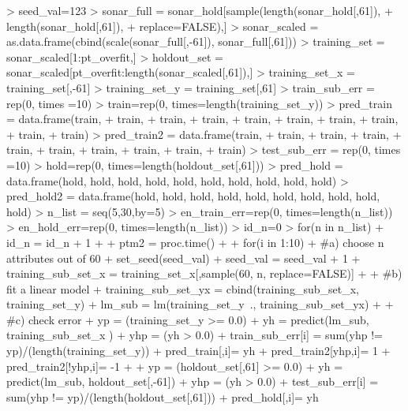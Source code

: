 \documentclass{article}
\begin{document}
\begin{Schunk}
\begin{Sinput}
> seed_val=123
> sonar_full = sonar_hold[sample(length(sonar_hold[,61]), 
+                                length(sonar_hold[,61]), 
+                                replace=FALSE),]
> sonar_scaled = as.data.frame(cbind(scale(sonar_full[,-61]), sonar_full[,61]))
> training_set =  sonar_scaled[1:pt_overfit,]
> holdout_set = sonar_scaled[pt_overfit:length(sonar_scaled[,61]),]
> training_set_x = training_set[,-61]
> training_set_y = training_set[,61]
> train_sub_err = rep(0, times =10)
> train=rep(0, times=length(training_set_y))
> pred_train = data.frame(train, 
+                         train, 
+                         train, 
+                         train, 
+                         train, 
+                         train, 
+                         train, 
+                         train, 
+                         train, 
+                         train) 
> pred_train2 = data.frame(train, 
+                          train, 
+                          train, 
+                          train, 
+                          train, 
+                          train, 
+                          train, 
+                          train, 
+                          train, 
+                          train) 
> test_sub_err = rep(0, times =10)
> hold=rep(0, times=length(holdout_set[,61]))
> pred_hold = data.frame(hold, hold, hold, hold, hold, hold, hold, hold, hold, hold) 
> pred_hold2 = data.frame(hold, hold, hold, hold, hold, hold, hold, hold, hold, hold) 
> n_list = seq(5,30,by=5)
> en_train_err=rep(0, times=length(n_list))
> en_hold_err=rep(0, times=length(n_list))
> id_n=0
> for(n in n_list){
+   id_n = id_n + 1 
+   
+   ptm2 = proc.time()
+   
+   for(i in 1:10){
+     #a) choose n attributes out of 60
+     set_seed(seed_val)
+     seed_val = seed_val + 1
+     training_sub_set_x = training_set_x[,sample(60, n, replace=FALSE)]
+     
+     #b) fit a linear model
+     training_sub_set_yx = cbind(training_sub_set_x, training_set_y)
+     lm_sub = lm(training_set_y~., training_sub_set_yx)
+     
+     #c) check error
+     yp = (training_set_y >= 0.0)
+     yh = predict(lm_sub, training_sub_set_x )
+     yhp = (yh > 0.0)
+     train_sub_err[i] = sum(yhp != yp)/(length(training_set_y))
+     pred_train[,i]= yh
+     pred_train2[yhp,i]= 1
+     pred_train2[!yhp,i]= -1
+     
+     yp = (holdout_set[,61] >= 0.0)
+     yh = predict(lm_sub, holdout_set[,-61])
+     yhp = (yh > 0.0)
+     test_sub_err[i] = sum(yhp != yp)/(length(holdout_set[,61]))
+     pred_hold[,i]= yh
}}
\end{Sinput}
\end{Schunk}
\end{document}
